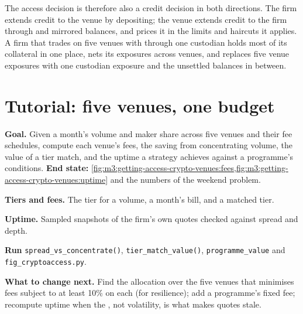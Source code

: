 The access decision is therefore also a credit decision in both directions. The firm extends credit to the venue by depositing; the venue extends credit
to the firm through  and mirrored balances, and prices it in the limits and haircuts it applies. A firm that trades on five venues with
 through one custodian holds most of its collateral in one place, nets its exposures across venues, and replaces five venue
exposures with one custodian exposure and the unsettled balances in between.

\section{Tutorial: five venues, one budget}\label{tut:m3:getting-access-crypto-venues:fees}

\begin{tutorial}
\textbf{Goal.} Given a month's volume and maker share across five venues and their fee schedules, compute each venue's fees, the saving from
concentrating volume, the value of a tier match, and the uptime a strategy achieves against a programme's conditions. \textbf{End state:}
\cref{fig:m3:getting-access-crypto-venues:fees,fig:m3:getting-access-crypto-venues:uptime} and the numbers of the weekend problem.
\begin{tutsteps}
\item \textbf{Tiers and fees.} The tier for a volume, a month's bill, and a matched tier.
\label{lst:m3:getting-access-crypto-venues:fees}
\item \textbf{Uptime.} Sampled snapshots of the firm's own quotes checked against spread and depth.
\label{lst:m3:getting-access-crypto-venues:uptime}
\item \textbf{Run} \texttt{spread\_vs\_concentrate()}, \texttt{tier\_match\_value()}, \texttt{programme\_value} and \texttt{fig\_cryptoaccess.py}.
\end{tutsteps}
\textbf{What to change next.} Find the allocation over the five venues that minimises fees subject to at least 10\% on each (for resilience); add a
programme's fixed fee; recompute uptime when the , not volatility, is what makes quotes stale.
\end{tutorial}

